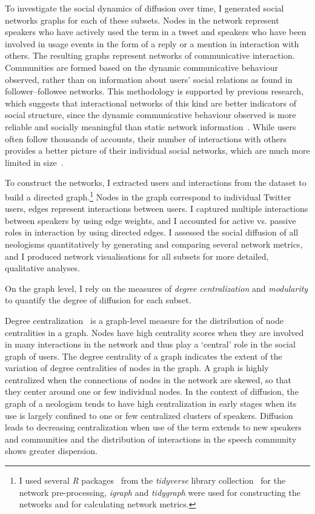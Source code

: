 \documentclass[
  a4paper,
  abstract=on,
  captions=tableabove
  ]{scrartcl}
\begin{document}
  To investigate the social dynamics of diffusion over time, I generated social networks graphs for each of these subsets. Nodes in the network represent speakers who have actively used the term in a tweet and speakers who have been involved in usage events in the form of a reply or a mention in interaction with others. The resulting graphs represent networks of communicative interaction. Communities are formed based on the dynamic communicative behaviour observed, rather than on information about users' social relations as found in follower--followee networks. This methodology is supported by previous research, which suggests that interactional networks of this kind are better indicators of social structure, since the dynamic communicative behaviour observed is more reliable and socially meaningful than static network information~\parencite{Goel2016SocialDynamics, Huberman2008SocialNetworks}. While users often follow thousands of accounts, their number of interactions with others provides a better picture of their individual social networks, which are much more limited in size~\parencite{Dunbar1992NeocortexSize}.

  To construct the networks, I extracted users and interactions from the dataset to build a directed graph.\footnote{I used several \emph{R} packages~\parencite{RCoreTeam2018LanguageEnvironment} from the \emph{tidyverse} library collection~\parencite{Wickham2019WelcomeTidyverse} for the network pre-processing, \emph{igraph} and \emph{tidygraph} were used for constructing the networks and for calculating network metrics.} Nodes in the graph correspond to individual Twitter users, edges represent interactions between users. I captured multiple interactions between speakers by using edge weights, and I accounted for active vs. passive roles in interaction by using directed edges. I assessed the social diffusion of all neologisms quantitatively by generating and comparing several network metrics, and I produced network visualisations for all subsets for more detailed, qualitative analyses.

  On the graph level, I rely on the measures of \emph{degree centralization} and \emph{modularity} to quantify the degree of diffusion for each subset.

  Degree centralization~\parencite{Freeman1978CentralitySocial} is a graph-level measure for the distribution of node centralities in a graph. Nodes have high centrality scores when they are involved in many interactions in the network and thus play a `central' role in the social graph of users. The degree centrality of a graph indicates the extent of the variation of degree centralities of nodes in the graph. A graph is highly centralized when the connections of nodes in the network are skewed, so that they center around one or few individual nodes. In the context of diffusion, the graph of a neologism tends to have high centralization in early stages when its use is largely confined to one or few centralized clusters of speakers. Diffusion leads to decreasing centralization when use of the term extends to new speakers and communities and the distribution of interactions in the speech community shows greater dispersion.
\end{document}
